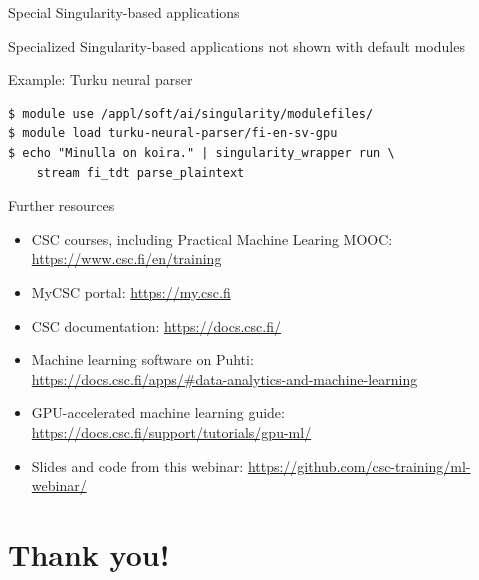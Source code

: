 \documentclass[aspectratio=1610,14pt]{beamer}
\newcommand{\link}[1]{\alert{\url{#1}}}
\begin{document}
\begin{frame}[fragile]{Special Singularity-based applications}

  Specialized Singularity-based applications not shown with default modules

  \vspace{1em}

  \alert{Example:} Turku neural parser

\begin{verbatim}
$ module use /appl/soft/ai/singularity/modulefiles/
$ module load turku-neural-parser/fi-en-sv-gpu
$ echo "Minulla on koira." | singularity_wrapper run \
    stream fi_tdt parse_plaintext
\end{verbatim}
  
\end{frame}

\begin{frame}{Further resources}
  \begin{itemize}
  \item CSC courses, including Practical Machine Learing MOOC: \link{https://www.csc.fi/en/training}
  \item MyCSC portal: \link{https://my.csc.fi}
  \item CSC documentation: \link{https://docs.csc.fi/}
  \item Machine learning software on Puhti: \\
    {\footnotesize \link{https://docs.csc.fi/apps/\#data-analytics-and-machine-learning}}
  \item GPU-accelerated machine learning guide: \link{https://docs.csc.fi/support/tutorials/gpu-ml/}
  \item Slides and code from this webinar: \link{https://github.com/csc-training/ml-webinar/}
  \end{itemize}
\end{frame}

\section*{Thank you!}
\end{document}
